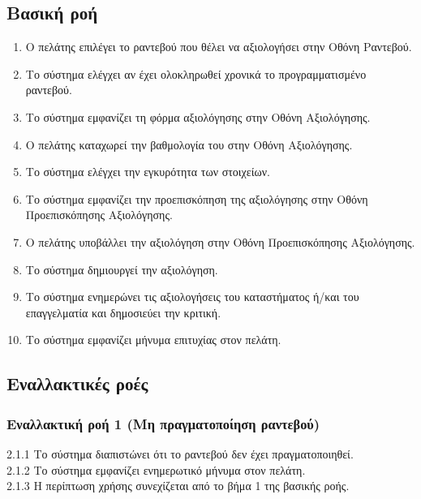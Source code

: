 \documentclass[12pt,a4paper,twoside]{book}
\begin{document}
\subsection{Βασική ροή}
\begin{enumerate}
    \item Ο πελάτης επιλέγει το ραντεβού που θέλει να αξιολογήσει στην Οθόνη Ραντεβού.
    \item Το σύστημα ελέγχει αν έχει ολοκληρωθεί χρονικά το προγραμματισμένο ραντεβού.
    \item Το σύστημα εμφανίζει τη φόρμα αξιολόγησης στην Οθόνη Αξιολόγησης.
    \item Ο πελάτης καταχωρεί την βαθμολογία του στην Οθόνη Αξιολόγησης.
    \item Το σύστημα ελέγχει την εγκυρότητα των στοιχείων.
    \item Το σύστημα εμφανίζει την προεπισκόπηση της αξιολόγησης στην Οθόνη Προεπισκόπησης Αξιολόγησης.
    \item Ο πελάτης υποβάλλει την αξιολόγηση στην Οθόνη Προεπισκόπησης Αξιολόγησης.
    \item Το σύστημα δημιουργεί την αξιολόγηση.
    \item Το σύστημα ενημερώνει τις αξιολογήσεις του καταστήματος ή/και του επαγγελματία και δημοσιεύει την κριτική.
    \item Το σύστημα εμφανίζει μήνυμα επιτυχίας στον πελάτη.
\end{enumerate}

\subsection{Εναλλακτικές ροές}


\subsubsection*{Εναλλακτική ροή 1 (Μη πραγματοποίηση ραντεβού)}
2.1.1 Το σύστημα διαπιστώνει ότι το ραντεβού δεν έχει πραγματοποιηθεί.\\
\hspace*{\parindent}2.1.2 Το σύστημα εμφανίζει ενημερωτικό μήνυμα στον πελάτη.\\
\hspace*{\parindent}2.1.3 Η περίπτωση χρήσης συνεχίζεται από το βήμα 1 της βασικής ροής.
\end{document}
